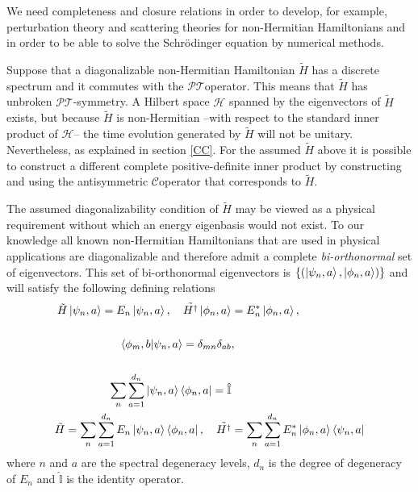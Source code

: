 \documentclass[12pt, a4paper]{report}
\newcommand\PT{\(\mathcal{PT}\)}
\newcommand\CC{\(\mathcal{C}\)}
\begin{document}
We need completeness and closure relations in order to develop, for example, perturbation theory and scattering theories for non-Hermitian Hamiltonians and in order to be able to solve the Schrödinger equation by numerical methods\cite{Moiseyev}.

Suppose that a diagonalizable non-Hermitian Hamiltonian $\tilde{H}$ has a discrete spectrum and it commutes with the \PT\:operator.  This means that  $\tilde{H}$ has unbroken \PT-symmetry. A Hilbert space $\mathcal{H}$ spanned by the eigenvectors of $\tilde{H}$ exists, but because $\tilde{H}$ is non-Hermitian --with respect to the standard inner product of $\mathcal{H}$-- the time evolution generated by $\tilde{H}$ will not be unitary\cite{Mostafazadeh}. Nevertheless, as explained in section \ref{CC}. For the assumed $\tilde{H}$ above it is possible to construct a different complete positive-definite inner product by constructing and using the antisymmetric \CC\:operator that corresponds to $\tilde{H}$.

The assumed diagonalizability condition of $\tilde{H}$ may be viewed as a physical requirement without which an energy eigenbasis would not exist. To our knowledge all known non-Hermitian Hamiltonians that are used in physical applications are diagonalizable and therefore admit a complete \emph{bi-orthonormal} set of eigenvectors. This set of bi-orthonormal eigenvectors is $\{(\ket{\psi_{n}, a}, \ket{\phi_{n}, a})\}$ and will satisfy the following defining relations\cite{Pseudo-HermiticityIII}
\begin{align}
\tilde{H}\ket{\psi_{n}, a} = E_{n}\ket{\psi_{n}, a},\quad\tilde{H^{\dagger}}\ket{\phi_{n}, a} &= E^{*}_{n}\ket{\phi_{n}, a},\\
\nonumber\\
\braket{\phi_{m}, b|\psi_{n}, a} = \delta_{mn}\delta_{ab}&,\\
\nonumber\\
\sum^{}_{n}\sum_{a=1}^{d_n}\ket{\psi_{n}, a}\bra{\phi_{n}, a} = \hat{\mathbb{I}}&\\
\tilde{H} = \sum^{}_{n}\sum_{a=1}^{d_n}E_{n}\ket{\psi_{n}, a}\bra{\phi_{n}, a},\quad\tilde{H^{\dagger}} &= \sum^{}_{n}\sum_{a=1}^{d_n}E_{n}^{*}\ket{\phi_{n}, a}\bra{\psi_{n}, a}
\end{align}
where $n$ and $a$ are the spectral degeneracy levels, $d_n$ is the degree of degeneracy of $E_n$ and $\hat{\mathbb{I}}$ is the identity operator\cite{Pseudo-HermiticityIII}.

\end{document}
